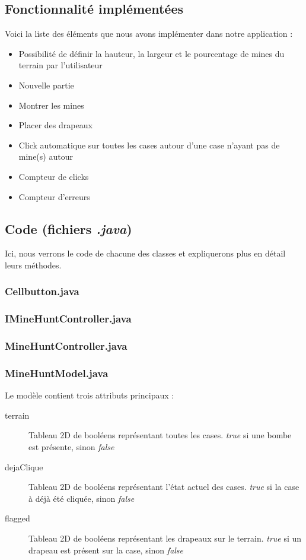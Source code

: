 \documentclass[a4paper, 10pt]{article}
\begin{document}
\subsection{Fonctionnalité implémentées}
Voici la liste des éléments que nous avons implémenter dans notre application :
\begin{itemize}
\item Possibilité de définir la hauteur, la largeur et le pourcentage de mines du terrain par l'utilisateur
\item Nouvelle partie
\item Montrer les mines
\item Placer des drapeaux
\item Click automatique sur toutes les cases autour d'une case n'ayant pas de mine(s) autour
\item Compteur de clicks
\item Compteur d'erreurs
\end{itemize}
\subsection{Code (fichiers \emph{.java})}
Ici, nous verrons le code de chacune des classes et expliquerons plus en détail leurs méthodes.
\subsubsection{Cellbutton.java}
\subsubsection{IMineHuntController.java}
\subsubsection{MineHuntController.java}
\subsubsection{MineHuntModel.java}
Le modèle contient trois attributs principaux :
\begin{description}
\item[terrain] Tableau 2D de booléens représentant toutes les cases. \emph{true} si une bombe est présente, sinon \emph{false}
\item[dejaClique] Tableau 2D de booléens représentant l'état actuel des cases. \emph{true} si la case à déjà été cliquée, sinon \emph{false}
\item[flagged] Tableau 2D de booléens représentant les drapeaux sur le terrain. \emph{true} si un drapeau est présent sur la case, sinon \emph{false}
\end{description}
\end{document}
